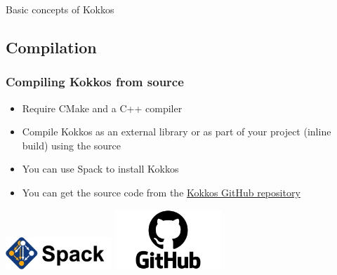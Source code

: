 \documentclass[aspectratio=169]{beamer}
\begin{document}
\begin{frame}
    \centering
    \Huge Basic concepts of Kokkos
\end{frame}


\subsection[Compilation]{Compilation}


\begin{frame}
    \frametitle{Compiling Kokkos from source} 
    \begin{itemize}
        \item Require CMake and a C++ compiler
        \item Compile Kokkos as an external library or as part of your project (inline build) using the source
        \item You can use Spack to install Kokkos
        \item You can get the source code from the \href{https://github.com/kokkos/kokkos}{Kokkos GitHub repository}
    \end{itemize}

    \hspace{1cm}

    \centering
    \includegraphics[width=0.3\textwidth]{../../images/spack.png}
    \includegraphics[width=0.3\textwidth]{../../images/GitHub-logo.png}

\end{frame}

\end{document}
